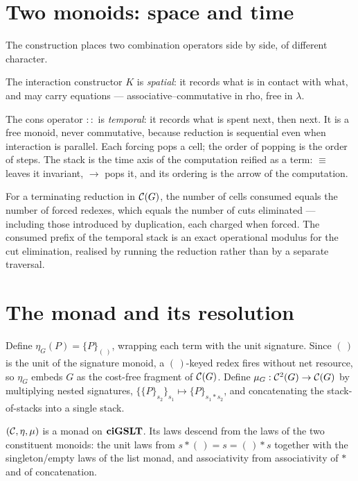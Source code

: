 \section{Two monoids: space and time}

The construction places two combination operators side by side, of different character.

The interaction constructor $K$ is \emph{spatial}: it records what is in contact with
what, and may carry equations --- associative--commutative in rho, free in $\lambda$.

The cons operator $::$ is \emph{temporal}: it records what is spent next, then next. It
is a free monoid, never commutative, because reduction is sequential even when
interaction is parallel. Each forcing pops a cell; the order of popping is the order of
steps. The stack is the time axis of the computation reified as a term: $\equiv$ leaves
it invariant, $\longrightarrow$ pops it, and its ordering is the arrow of the computation.

\begin{proposition}
For a terminating reduction in $\mathcal{C}(G)$, the number of cells consumed equals the number
of forced redexes, which equals the number of cuts eliminated --- including those
introduced by duplication, each charged when forced. The consumed prefix of the temporal
stack is an exact operational modulus for the cut elimination, realised by running the
reduction rather than by a separate traversal.
\end{proposition}

\section{The monad and its resolution}

\begin{construction}
Define $\eta_G(P) = \{P\}_{(\,)}$, wrapping each term with the unit signature. Since
$(\,)$ is the unit of the signature monoid, a $(\,)$-keyed redex fires without net
resource, so $\eta_G$ embeds $G$ as the cost-free fragment of $\mathcal{C}(G)$. Define
$\mu_G : \mathcal{C}^2(G) \to \mathcal{C}(G)$ by multiplying nested signatures,
$\{\{P\}_{s_2}\}_{s_1} \mapsto \{P\}_{s_1 * s_2}$, and concatenating the stack-of-stacks
into a single stack.
\end{construction}

\begin{proposition}
$(\mathcal{C}, \eta, \mu)$ is a monad on $\mathbf{ciGSLT}$. Its laws descend from the laws of the two
constituent monoids: the unit laws from $s * (\,) = s = (\,) * s$ together with the
singleton/empty laws of the list monad, and associativity from associativity of $*$ and
of concatenation.
\end{proposition}

